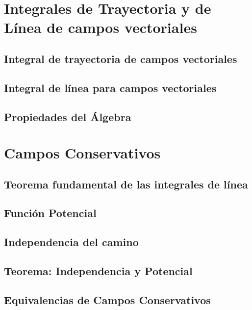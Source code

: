 \documentclass{report}
\begin{document}
\section{Integrales de Trayectoria y de L\'inea de campos vectoriales}
         \subsection{Integral de trayectoria de campos vectoriales}
                 
        \subsection{Integral de línea para campos vectoriales}
             
   \subsection{Propiedades del Álgebra}
             
         

      
  \section{Campos Conservativos}
  \subsection{Teorema fundamental de las integrales de línea}
  
  \subsection{Función Potencial}
  
   \subsection{Independencia del camino}
   
   \subsection{Teorema: Independencia y Potencial}
   
   \subsection{Equivalencias de Campos Conservativos}
 
\end{document}
